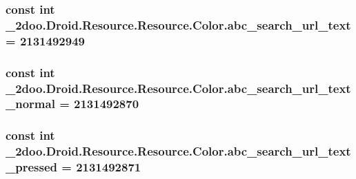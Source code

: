 \hypertarget{class__2doo_1_1_droid_1_1_resource_1_1_color_15c74b4ded1cca029f11ec5f87d0177f}{
\subsubsection[{abc\_\-search\_\-url\_\-text}]{\setlength{\rightskip}{0pt plus 5cm}const int \_\-2doo.Droid.Resource.Resource.Color.abc\_\-search\_\-url\_\-text = 2131492949}}
\label{class__2doo_1_1_droid_1_1_resource_1_1_color_15c74b4ded1cca029f11ec5f87d0177f}


\hypertarget{class__2doo_1_1_droid_1_1_resource_1_1_color_89fda7375a221f2458112a41bf5b6f43}{
\subsubsection[{abc\_\-search\_\-url\_\-text\_\-normal}]{\setlength{\rightskip}{0pt plus 5cm}const int \_\-2doo.Droid.Resource.Resource.Color.abc\_\-search\_\-url\_\-text\_\-normal = 2131492870}}
\label{class__2doo_1_1_droid_1_1_resource_1_1_color_89fda7375a221f2458112a41bf5b6f43}


\hypertarget{class__2doo_1_1_droid_1_1_resource_1_1_color_ddb791ff45767c0eec8ecf7411917a3f}{
\subsubsection[{abc\_\-search\_\-url\_\-text\_\-pressed}]{\setlength{\rightskip}{0pt plus 5cm}const int \_\-2doo.Droid.Resource.Resource.Color.abc\_\-search\_\-url\_\-text\_\-pressed = 2131492871}}
\label{class__2doo_1_1_droid_1_1_resource_1_1_color_ddb791ff45767c0eec8ecf7411917a3f}



